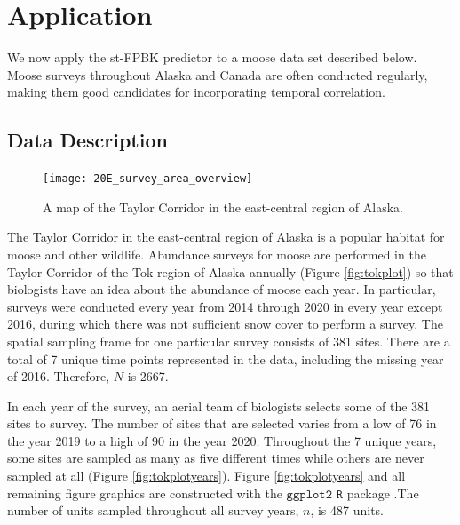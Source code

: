 \documentclass[]{interact}
\theoremstyle{plain}%
\theoremstyle{definition}
\theoremstyle{remark}
\begin{document}
\section{Application} \label{section:Application}

We now apply the st-FPBK predictor to a moose data set described below.
Moose surveys throughout Alaska and Canada are often conducted
regularly, making them good candidates for incorporating temporal
correlation.

\subsection{Data Description}

\begin{figure}
\texttt{[image: 20E\_survey\_area\_overview]} \caption{\label{fig:tokplot} A map of the Taylor Corridor in the east-central region of Alaska.}\label{fig:unnamed-chunk-2}
\end{figure}

The Taylor Corridor in the east-central region of Alaska is a popular
habitat for moose and other wildlife. Abundance surveys for moose are
performed in the Taylor Corridor of the Tok region of Alaska annually
(Figure \ref{fig:tokplot}) so that biologists have an idea about the
abundance of moose each year. In particular, surveys were conducted
every year from 2014 through 2020 in every year except 2016, during
which there was not sufficient snow cover to perform a survey. The
spatial sampling frame for one particular survey consists of 381 sites.
There are a total of 7 unique time points represented in the data,
including the missing year of 2016. Therefore, \(N\) is 2667.

In each year of the survey, an aerial team of biologists selects some of
the 381 sites to survey. The number of sites that are selected varies
from a low of 76 in the year 2019 to a high of 90 in the year 2020.
Throughout the 7 unique years, some sites are sampled as many as five
different times while others are never sampled at all (Figure
\ref{fig:tokplotyears}). Figure \ref{fig:tokplotyears} and all remaining
figure graphics are constructed with the \(\texttt{ggplot2 R}\) package
\citep{wickham2016data}.The number of units sampled throughout all
survey years, \(n\), is 487 units.
\end{document}
